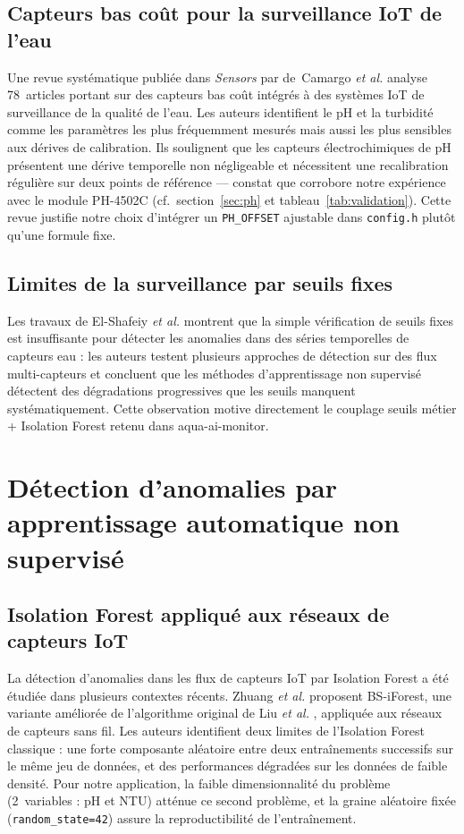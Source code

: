 \documentclass[12pt,a4paper]{report}
\newcommand{\code}[1]{\texttt{\small\colorbox{codebg}{#1}}}
\begin{document}
\subsection{Capteurs bas coût pour la surveillance IoT de l'eau}

Une revue systématique publiée dans \textit{Sensors} par de~Camargo \textit{et al.}
\cite{camargo2023lowcost} analyse 78~articles portant sur des capteurs bas coût
intégrés à des systèmes IoT de surveillance de la qualité de l'eau.
Les auteurs identifient le pH et la turbidité comme les paramètres les plus
fréquemment mesurés mais aussi les plus sensibles aux dérives de calibration.
Ils soulignent que les capteurs électrochimiques de pH présentent une dérive
temporelle non négligeable et nécessitent une recalibration régulière sur deux
points de référence --- constat que corrobore notre expérience avec le module
PH-4502C (cf.~section~\ref{sec:ph} et tableau~\ref{tab:validation}).
Cette revue justifie notre choix d'intégrer un \code{PH\_OFFSET} ajustable dans
\code{config.h} plutôt qu'une formule fixe.

\subsection{Limites de la surveillance par seuils fixes}

Les travaux de El-Shafeiy \textit{et al.} \cite{elshafeiy2023anomaly} montrent
que la simple vérification de seuils fixes est insuffisante pour détecter les
anomalies dans des séries temporelles de capteurs eau : les auteurs testent
plusieurs approches de détection sur des flux multi-capteurs et concluent que
les méthodes d'apprentissage non supervisé détectent des dégradations progressives
que les seuils manquent systématiquement. Cette observation motive directement
le couplage seuils métier + Isolation Forest retenu dans aqua-ai-monitor.

\section{Détection d'anomalies par apprentissage automatique non supervisé}

\subsection{Isolation Forest appliqué aux réseaux de capteurs IoT}

La détection d'anomalies dans les flux de capteurs IoT par Isolation Forest a été
étudiée dans plusieurs contextes récents. Zhuang \textit{et al.}
\cite{zhuang2023bsiforest} proposent BS-iForest, une variante améliorée de
l'algorithme original de Liu \textit{et al.} \cite{liu2008isolation}, appliquée
aux réseaux de capteurs sans fil. Les auteurs identifient deux limites de
l'Isolation Forest classique : une forte composante aléatoire entre deux
entraînements successifs sur le même jeu de données, et des performances dégradées
sur les données de faible densité. Pour notre application, la faible dimensionnalité
du problème (2~variables : pH et NTU) atténue ce second problème, et la graine
aléatoire fixée (\code{random\_state=42}) assure la reproductibilité de
l'entraînement.
\end{document}
